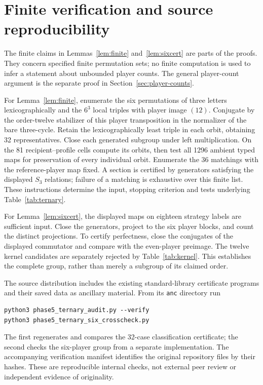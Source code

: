 \section{Finite verification and source reproducibility}\label{app:verification}
The finite claims in Lemmas~\ref{lem:finite} and~\ref{lem:sixcert} are
parts of the proofs. They concern specified finite permutation sets; no
finite computation is used to infer a statement about unbounded player counts.
The general player-count argument is the separate proof in
Section~\ref{sec:player-counts}.

For Lemma~\ref{lem:finite}, enumerate the six permutations of three letters
lexicographically and the $6^3$ local triples with player image $(12)$.
Conjugate by the order-twelve stabilizer of this player transposition in the
normalizer of the bare three-cycle. Retain the lexicographically least triple
in each orbit, obtaining 32 representatives. Close each generated subgroup
under left multiplication. On the 81 recipient--profile cells compute its
orbits, then test all 1296 ambient typed maps for preservation of every
individual orbit. Enumerate the 36 matchings with the reference-player map
fixed. A section is certified by generators satisfying the displayed
$S_3$ relations; failure of a matching is exhaustive over this finite list.
These instructions determine the input, stopping criterion and tests underlying
Table~\ref{tab:ternary}.

For Lemma~\ref{lem:sixcert}, the displayed maps on eighteen strategy labels
are sufficient input. Close the generators, project to the six player blocks,
and count the distinct projections. To certify perfectness, close the
conjugates of the displayed commutator and compare with the even-player
preimage. The twelve kernel candidates are separately rejected by
Table~\ref{tab:kernel}. This establishes the complete group, rather than
merely a subgroup of its claimed order.

The source distribution includes the existing standard-library certificate
programs and their saved data as ancillary material. From its \texttt{anc}
directory run
\begin{verbatim}
python3 phase5_ternary_audit.py --verify
python3 phase5_ternary_six_crosscheck.py
\end{verbatim}
The first regenerates and compares the 32-case classification certificate;
the second checks the six-player group from a separate implementation.
The accompanying verification manifest identifies the original repository
files by their hashes. These are reproducible internal checks, not external
peer review or independent evidence of originality.
